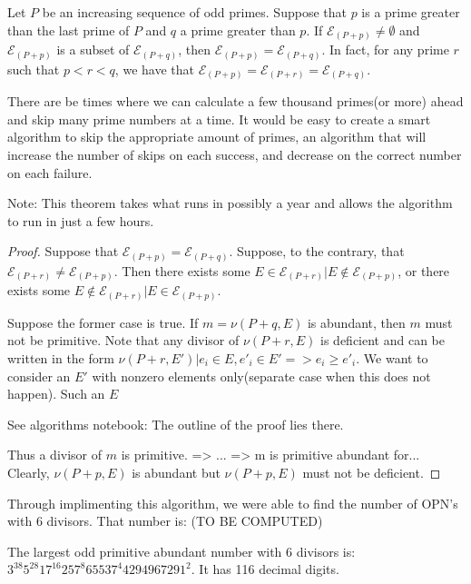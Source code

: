 \documentclass[../paper.tex]{subfiles}
\begin{document}
\begin{theorem} 
Let $P$ be an increasing sequence of odd primes. Suppose
that $p$ is a prime greater than the last prime of $P$ and $q$ a
prime greater than $p$. If $\mathcal{E}_{(P + p)} \neq 
\emptyset$ and $\mathcal{E}_{(P + p)}$ is a subset of 
$\mathcal{E}_{(P + q)}$, then $\mathcal{E}_{(P + p)} = 
\mathcal{E}_{(P + q)}$. In fact, for any prime $r$ such that $p <
r < q$, we have that $\mathcal{E}_{(P + p)} = \mathcal{E}_{(P +
r)} = \mathcal{E}_{(P + q)}$.
\end{theorem}

There are be times where we can
calculate a few thousand primes(or more) ahead and skip many prime
numbers at a time. It would be easy to create a smart algorithm to
skip the appropriate amount of primes, an algorithm that will
increase the number of skips on each success, and decrease on the
correct number on each failure. 

Note: This theorem takes what runs in possibly a year and allows
the algorithm to run in just a few hours.

\begin{proof}

Suppose that $\mathcal{E}_{(P + p)} = \mathcal{E}_{(P + q)}$.
Suppose, to the contrary, that $\mathcal{E}_{(P+r)} \neq
\mathcal{E}_{(P + p)}$. Then there exists some $E \in
\mathcal{E}_{(P + r)} | E \notin \mathcal{E}_{(P + p)}$, or there
exists some $E \notin \mathcal{E}_{(P + r)} | E \in \mathcal{E}_{(P +
p)}$. 

Suppose the former case is true. If $m = \nu(P + q, E)$ is abundant,
then $m$ must not be primitive. Note that any divisor of $\nu(P +
r, E)$ is deficient and can be written in the form $\nu(P + r, E')
| e_i \in E, e'_i \in E' => e_i \geq e'_i$. We want to consider
an $E'$ with nonzero elements only(separate case when this does
not happen). Such an $E$ 

See algorithms notebook: The outline of the proof lies there.

Thus a divisor of $m$ is
primitive. => ... => m is primitive abundant for...
Clearly, $\nu(P + p, E)$ is
abundant but $\nu(P + p, E)$ must not be deficient. 

\end{proof}

Through implimenting this algorithm, we were able to find the
number of OPN's with 6 divisors. That number is: (TO BE COMPUTED)


The largest odd primitive abundant number with 6 divisors is:
$3^38 5^28 17^16 257^8 65537^4 4294967291^2$. It has 116 decimal
digits.
\end{document}
